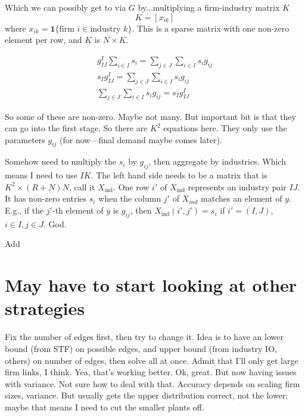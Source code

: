 \documentclass[11pt]{article}
\begin{document}
Which we can possibly get to via $G$ by...multiplying a firm-industry matrix $K$
\[
K = [x_{ik} ]
\]
where $x_{ik} = \mathbf{1} \{ \text{firm } i \in \text{industry } k \}$. This is a sparse matrix with one non-zero element per row, and $K$ is $N \times K$. 

\begin{gather}
g^I_{IJ} \sum_{i\in I} s_i = \sum_{j \in J} \sum_{i \in I} s_i g_{ij} \\
s_I g^I_{IJ} = \sum_{j \in J} \sum_{i \in I} s_i g_{ij} \\
\sum_{j \in J} \sum_{i \in I} s_i g_{ij} = s_I g^I_{IJ}
\end{gather}
 
 So some of these are non-zero. Maybe not many. But important bit is that they can go into the first stage. So there are $K^2$ equations here. They only use the parameters $g_{ij}$ (for now---final demand maybe comes later).
 
 Somehow need to multiply the $s_i$ by $g_{ij}$, then aggregate by industries. Which means I need to use $IK$. The left hand side needs to be a matrix that is $K^2 \times (R+N)N$, call it $X_{\text{ind}}$. One row $i'$ of $X_{\text{ind}}$ represents an industry pair $IJ$. It has non-zero entries $s_i$ when the column $j'$ of $X_{ind}$ matches an element of $y$. E.g., if the $j'$-th element of $y$ is $g_{ij}$, then $X_{\text{ind}}(i',j') = s_i$ if $i'=(I,J)$, $i \in I, j \in J$. God.

Add 


\section{May have to start looking at other strategies}
Fix the number of edges first, then try to change it. Idea is to have an lower bound (from STF) on possible edges, and upper bound (from industry IO, others) on number of edges, then solve all at once. Admit that I'll only get large firm links, I think. Yea, that's working better. Ok, great. But now having issues with variance. Not sure how to deal with that. Accuracy depends on scaling firm sizes, variance. But usually gets the upper distribution correct, not the lower; maybe that means I need to cut the smaller plants off.



\end{document}
